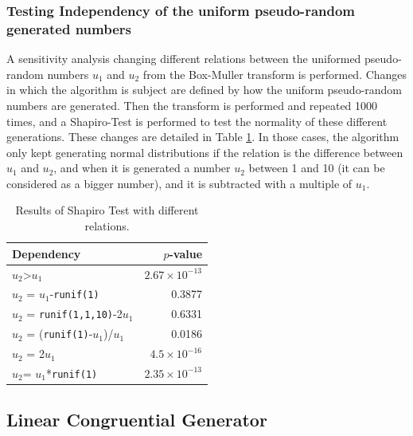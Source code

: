 \documentclass[10pt,leter,openany]{article}
\begin{document}
		\vspace{0.7cm}
		

	\subsubsection{Testing Independency of the uniform pseudo-random generated numbers}

		A sensitivity analysis changing different relations between the uniformed pseudo-random numbers $ u_{1} $ and $ u_{2} $ from the Box-Muller transform is performed. Changes in which the algorithm is subject are defined by how the uniform pseudo-random numbers are generated. Then the transform is performed and repeated 1000 times, and a Shapiro-Test is performed to test the normality of these different generations. These changes are detailed in Table \ref{tab:dep}. In those cases, the algorithm only kept generating normal distributions if the relation is the difference between $ u_{1}$ and $ u_{2} $, and when it is generated a number $ u_{2} $ between 1 and 10 (it can be considered as a bigger number), and it is subtracted with a multiple of $u_{1}$.


		\begin{table}[]
			\centering
			\caption{Results of Shapiro Test with different relations.}
			\label{tab:dep}
			\begin{tabular}{@{}lr@{}}
				\toprule
				Dependency                     & $ p $-value   \\ \midrule
				$ u_{2} $\textgreater{}$u_{1}$             & $ 2.67\times 10^{-13} $ \\
				$ u_{2} $ = $u_{1}$-\texttt{runif(1)}               & 0.3877    \\
				$ u_{2} $ = \texttt{runif(1,1,10)}-2$u_{1}$ & 0.6331    \\
				$ u_{2} $ = (\texttt{runif(1)}-$u_{1}$)/$u_{1}$          & 0.0186    \\
				$ u_{2} $ = 2$u_{1}$                     & $ 4.5\times10^{-16} $ \\
				$ u_{2} $= $u_{1}$*\texttt{runif(1)}               & $2.35 \times 10^{-13}$ \\ \bottomrule
			\end{tabular}
		\end{table}

	\subsection{Linear Congruential Generator}
\end{document}
